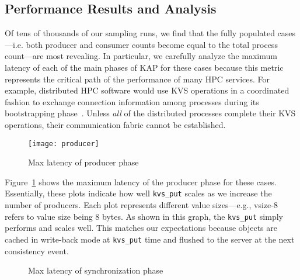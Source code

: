 \subsection{Performance Results and Analysis}
\label{results}
Of tens of thousands of our sampling runs, we find that the fully populated
cases---i.e. both producer and consumer counts become equal to the total
process count---are most revealing. In particular, we carefully analyze 
the maximum latency of each of the main phases of KAP for these cases 
because this metric represents the critical path of the performance of
many HPC services. For example, distributed 
HPC software would use KVS operations in a coordinated fashion to exchange 
connection information among processes during its bootstrapping 
phase~\cite{LIBI,PMI2}. Unless {\em all} 
of the distributed processes complete their
KVS operations, their communication fabric cannot be established. 

\begin{figure}
  \centering
  \texttt{[image: producer]}
  \caption{Max latency of producer phase}
  \vspace{-.5cm}	
  \label{fig:prod}
\end{figure}

Figure~\ref{fig:prod} shows the maximum latency of the producer phase
for these cases. Essentially, these plots indicate how well {\tt kvs\_put}
scales as we increase the number of producers. Each plot represents
different value sizes---e.g., vsize-8 refers to value size being
8 bytes. As shown in this graph, the {\tt kvs\_put} simply performs and
scales well. This matches our expectations because objects
are cached in write-back mode at {\tt kvs\_put} time and flushed to the
server at the next consistency event. 

\ifcomments
{}


\begin{figure}[ht]
\centering
\begin{subfigure}[With unique values]{
  \texttt{[image: sync]}
  \label{fig:sync:noredund}
}%
\end{subfigure}
\begin{subfigure}[With redundant values]{
  \texttt{[image: sync]}
  \label{fig:sync:redund}
}%
\end{subfigure}
\caption{Max latency of synchronization phase}
\label{fig:sync}
\end{figure}


